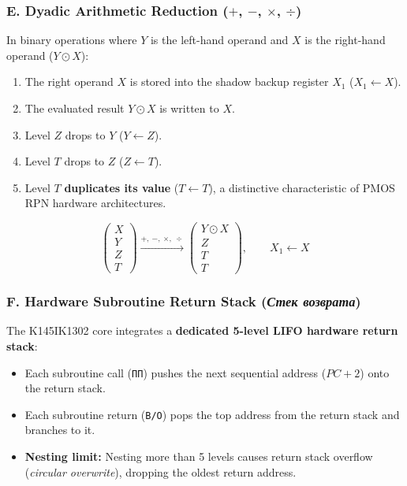 \documentclass[11pt,a4paper]{article}
\begin{document}
\subsubsection{E. Dyadic Arithmetic Reduction \texorpdfstring{($+$, $-$, $\times$, $\div$)}{(+, -, *, /)}}
In binary operations where $Y$ is the left-hand operand and $X$ is the right-hand operand ($Y \odot X$):
\begin{enumerate}
    \item The right operand $X$ is stored into the shadow backup register $X_1$ ($X_1 \leftarrow X$).
    \item The evaluated result $Y \odot X$ is written to $X$.
    \item Level $Z$ drops to $Y$ ($Y \leftarrow Z$).
    \item Level $T$ drops to $Z$ ($Z \leftarrow T$).
    \item Level $T$ \textbf{duplicates its value} ($T \leftarrow T$), a distinctive characteristic of PMOS RPN hardware architectures.
\end{enumerate}
\[
\begin{pmatrix} X \\ Y \\ Z \\ T \end{pmatrix} \xrightarrow{\mathbf{+,\ -,\ \times,\ \div}} \begin{pmatrix} Y \odot X \\ Z \\ T \\ T \end{pmatrix}, \qquad X_1 \leftarrow X
\]

\subsubsection{F. Hardware Subroutine Return Stack (\textit{Стек возврата})}
The K145IK1302 core integrates a \textbf{dedicated 5-level LIFO hardware return stack}:
\begin{itemize}
    \item Each subroutine call (\texttt{ПП}) pushes the next sequential address ($PC + 2$) onto the return stack.
    \item Each subroutine return (\texttt{В/О}) pops the top address from the return stack and branches to it.
    \item \textbf{Nesting limit:} Nesting more than 5 levels causes return stack overflow (\textit{circular overwrite}), dropping the oldest return address.
\end{itemize}
\end{document}
